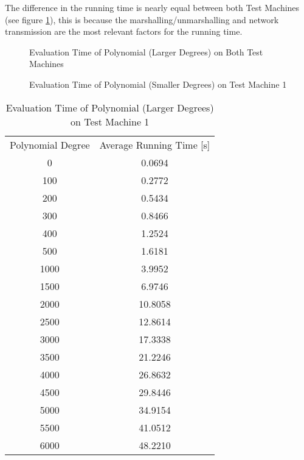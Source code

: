 The difference in the running time is nearly equal between both Test Machines
(see figure \ref{fig:poly-deg-t}), this is because the marshalling/unmarshalling
and network transmission are the most relevant factors for the running time.

\begin{figure}[ht]
  \centering
  
  \caption{Evaluation Time of Polynomial (Larger Degrees) on Both Test Machines}
  \label{fig:poly-deg-t}
\end{figure}

\begin{figure}[ht]
  \centering
  
  \caption{Evaluation Time of Polynomial (Smaller Degrees) on Test Machine 1}
  \label{fig:poly-deg-t-small}
\end{figure}

\begin{table}[ht]
  \centering
  \begin{tabular}{|c|c|}
    Polynomial Degree & Average Running Time [s] \\
    0 & 0.0694 \\
    100 & 0.2772 \\
    200 & 0.5434 \\
    300 & 0.8466 \\
    400 & 1.2524 \\
    500 & 1.6181 \\
    1000 &  3.9952 \\
    1500 &  6.9746 \\
    2000 & 10.8058 \\
    2500 & 12.8614 \\
    3000 & 17.3338 \\
    3500 & 21.2246 \\
    4000 & 26.8632 \\
    4500 & 29.8446 \\
    5000 & 34.9154 \\
    5500 & 41.0512 \\
    6000 & 48.2210 \\
  \end{tabular}
  \caption{Evaluation Time of Polynomial (Larger Degrees) on Test Machine 1}
  \label{tab:poly-deg-t}
\end{table}

